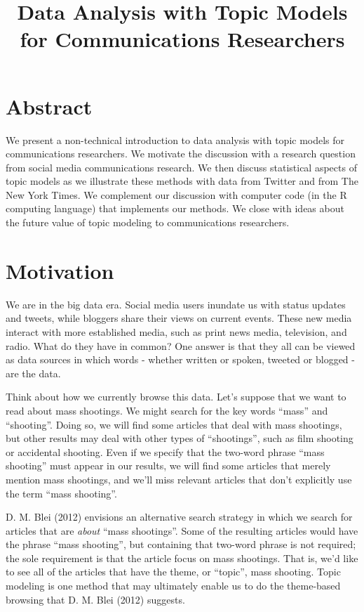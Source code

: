 \documentclass[12pt,]{article}
\title{Data Analysis with Topic Models for Communications Researchers}
\author{}
\date{}
\begin{document}
\maketitle

\pagestyle{fancy}

\section{Abstract}\label{abstract}

We present a non-technical introduction to data analysis with topic
models for communications researchers. We motivate the discussion with a
research question from social media communications research. We then
discuss statistical aspects of topic models as we illustrate these
methods with data from Twitter and from The New York Times. We
complement our discussion with computer code (in the R computing
language) that implements our methods. We close with ideas about the
future value of topic modeling to communications researchers.

\section{Motivation}\label{motivation}

We are in the big data era. Social media users inundate us with status
updates and tweets, while bloggers share their views on current events.
These new media interact with more established media, such as print news
media, television, and radio. What do they have in common? One answer is
that they all can be viewed as data sources in which words - whether
written or spoken, tweeted or blogged - are the data.

Think about how we currently browse this data. Let's suppose that we
want to read about mass shootings. We might search for the key words
``mass'' and ``shooting''. Doing so, we will find some articles that
deal with mass shootings, but other results may deal with other types of
``shootings'', such as film shooting or accidental shooting. Even if we
specify that the two-word phrase ``mass shooting'' must appear in our
results, we will find some articles that merely mention mass shootings,
and we'll miss relevant articles that don't explicitly use the term
``mass shooting''.

D. M. Blei (2012) envisions an alternative search strategy in which we
search for articles that are \emph{about} ``mass shootings''. Some of
the resulting articles would have the phrase ``mass shooting'', but
containing that two-word phrase is not required; the sole requirement is
that the article focus on mass shootings. That is, we'd like to see all
of the articles that have the theme, or ``topic'', mass shooting. Topic
modeling is one method that may ultimately enable us to do the
theme-based browsing that D. M. Blei (2012) suggests.
\end{document}

